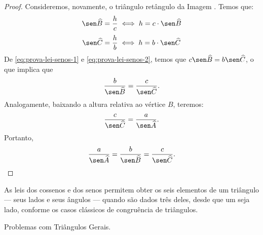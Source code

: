 \begin{proof}
    Consideremos, novamente, o triângulo retângulo da Imagem . %
    Temos que:
    \begin{equation}
    \label{eq:prova-lei-senos-1}
        \sen \widehat B = \frac h c \iff h = c \cdot \sen \widehat B
    \end{equation}
    \begin{equation}
    \label{eq:prova-lei-senos-2}
        \sen \widehat C = \frac h b \iff h = b \cdot \sen \widehat C
    \end{equation}
    De \ref{eq:prova-lei-senos-1} e \ref{eq:prova-lei-senos-2}, temos que $c \sen \widehat B = b \sen \widehat C$,
    o que implica que $$\frac b {\sen \widehat B} = \frac c {\sen \widehat C}.$$ Analogamente, 
    baixando a altura relativa ao vértice $B$, teremos: $$ \frac c {\sen \widehat C} = \frac a {\sen \widehat A}.$$
    Portanto, $$\frac a {\sen \widehat A} = \frac b {\sen \widehat B} = \frac c {\sen \widehat C}.$$
\end{proof}

As leis dos cossenos e dos senos permitem obter os seis elementos de
um triângulo --- seus lados e seus ângulos --- quando são dados três deles, desde que um seja lado,
conforme os casos clássicos de congruência de triângulos.

\begin{onlineact}
    {Problemas com Triângulos Gerais}.
\end{onlineact}